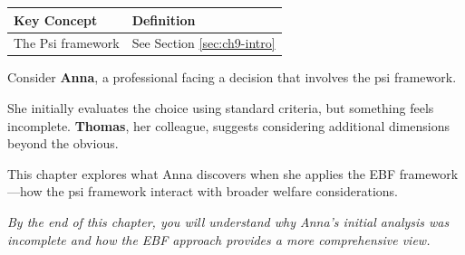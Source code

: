 \begin{tcolorbox}[
    colback=gray!5!white,
    colframe=gray!75!black,
    title={\textbf{Begriffe in diesem Kapitel}},
    fonttitle=\bfseries
]
\small
\begin{tabular}{@{}ll@{}}
\textbf{Key Concept} & \textbf{Definition} \\
\midrule
The Psi framework & See Section \ref{sec:ch9-intro} \\
\end{tabular}
\end{tcolorbox}



\begin{tcolorbox}[
    colback=blue!5!white,
    colframe=blue!75!black,
    title={\textbf{Intuition: A Motivating Example}},
    fonttitle=\bfseries
]
Consider \textbf{Anna}, a professional facing a decision that involves the psi framework.

She initially evaluates the choice using standard criteria, but something feels incomplete.
\textbf{Thomas}, her colleague, suggests considering additional dimensions beyond the obvious.

This chapter explores what Anna discovers when she applies the EBF framework---how
the psi framework interact with broader welfare considerations.

\medskip
\textit{By the end of this chapter, you will understand why Anna's initial analysis
was incomplete and how the EBF approach provides a more comprehensive view.}
\end{tcolorbox}




